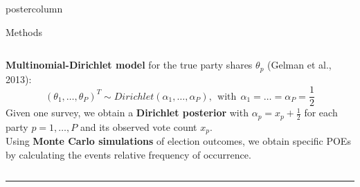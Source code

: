 \documentclass[final,hyperref={pdfpagelabels=false}]{beamer}
\newcommand{\darkgray}[1]{\textcolor{koaladarkgray}{#1}}
\begin{document}
\begin{frame}
\begin{columns}
\begin{column}{1\textwidth}
\begin{columns}[T]
\begin{column}{.484\textwidth}
\begin{beamercolorbox}[center,wd=\textwidth]{postercolumn}
\begin{minipage}[T]{.95\textwidth}
\begin{block}{\footnotesize Methods}
\begin{minipage}{\textwidth}
\begin{columns}[t]
  \begin{column}{.93\textwidth}
  \vspace{7px}
  \begin{minipage}{\textwidth}
  \darkgray{\textbf{Multinomial-Dirichlet model}}
for the true party shares $\theta_p$ {\footnotesize (Gelman et al., 2013)}:
$$
(\theta_1,\ldots,\theta_P)^T \sim Dirichlet(\alpha_1,\ldots,\alpha_P), \ \ \text{with} \ \ \alpha_1 = \ldots = \alpha_P = \frac{1}{2}
$$
Given one survey, we obtain a \darkgray{\textbf{Dirichlet posterior}}
with $\alpha_p = x_p + \frac{1}{2}$ for each party $p=1,\ldots,P$ and its observed
vote count $x_p$.
\\[0.5cm]
Using \darkgray{\textbf{Monte Carlo simulations}} of election outcomes, we obtain 
specific POEs by calculating the events relative frequency of occurrence.
  \end{minipage}
  \vspace{7px}
  \end{column}
\end{columns}
\end{minipage}

\vspace{1ex}
\textcolor{LMUlightgray}{\hrule{}}
\vspace{3ex}


\end{block}
\end{minipage}
\end{beamercolorbox}
\end{column}
\end{columns}
\end{column}
\end{columns}
\end{frame}
\end{document}
